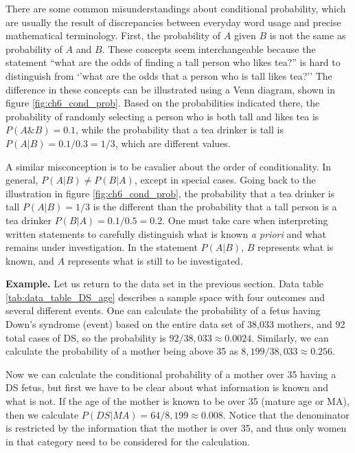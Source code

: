 \documentclass[
]{book}
\theoremstyle{definition}
\theoremstyle{definition}
\theoremstyle{definition}
\theoremstyle{remark}
\begin{document}
There are some common misunderstandings about conditional probability, which are usually the result of discrepancies between everyday word usage and precise mathematical terminology. First, the probability of \(A\) given \(B\) is not the same as probability of \(A\) and \(B\). These concepts seem interchangeable because the statement ``what are the odds of finding a tall person who likes tea?'' is hard to distinguish from `'what are the odds that a person who is tall likes tea?'' The difference in these concepts can be illustrated using a Venn diagram, shown in figure \ref{fig:ch6_cond_prob}. Based on the probabilities indicated there, the probability of randomly selecting a person who is both tall and likes tea is \(P(A \& B) = 0.1\), while the probability that a tea drinker is tall is \(P(A | B) = 0.1/0.3 = 1/3\), which are different values.

A similar misconception is to be cavalier about the order of conditionality. In general, \(P(A | B) \neq P(B |A)\), except in special cases. Going back to the illustration in figure \ref{fig:ch6_cond_prob}, the probability that a tea drinker is tall \(P(A | B) = 1/3\) is the different than the probability that a tall person is a tea drinker \(P(B|A) = 0.1/0.5 = 0.2\). One must take care when interpreting written statements to carefully distinguish what is known \emph{a priori} and what remains under investigation. In the statement \(P(A | B)\), \(B\) represents what is known, and \(A\) represents what is still to be investigated.

\textbf{Example.} Let us return to the data set in the previous section. Data table \ref{tab:data_table_DS_age} describes a sample space with four outcomes and several different events. One can calculate the probability of a fetus having Down's syndrome (event) based on the entire data set of 38,033 mothers, and 92 total cases of DS, so the probability is \(92/38,033 \approx 0.0024\). Similarly, we can calculate the probability of a mother being above 35 as \(8,199/ 38,033 \approx 0.256\).

Now we can calculate the conditional probability of a mother over 35 having a DS fetus, but first we have to be clear about what information is known and what is not. If the age of the mother is known to be over 35 (mature age or MA), then we calculate \(P(DS | MA) = 64/8,199 \approx 0.008\). Notice that the denominator is restricted by the information that the mother is over 35, and thus only women in that category need to be considered for the calculation.
\end{document}
